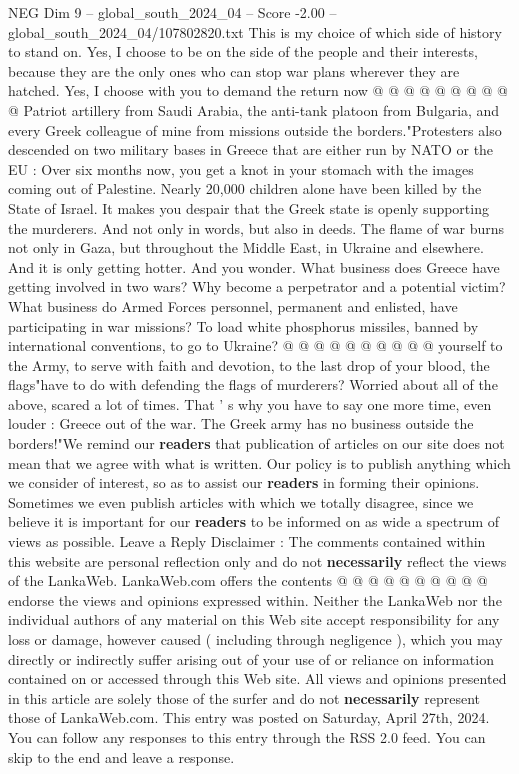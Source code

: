 \begin{textsample}{NEG Dim 9 – global\_south\_2024\_04 – Score -2.00 – global\_south\_2024\_04/107802820.txt}
This is my choice of which side of history to stand on.
Yes, I choose to be on the side of the people and their interests, because they are the only ones who can stop war plans wherever they are hatched.
Yes, I choose with you to demand the return now @ @ @ @ @ @ @ @ @ @ Patriot artillery from Saudi Arabia, the anti-tank platoon from Bulgaria, and every Greek colleague of mine from missions outside the borders."Protesters also descended on two military bases in Greece that are either run by NATO or the EU : Over six months now, you get a knot in your stomach with the images coming out of Palestine.
Nearly 20,000 children alone have been killed by the State of Israel.
It makes you despair that the Greek state is openly supporting the murderers.
And not only in words, but also in deeds.
The flame of war burns not only in Gaza, but throughout the Middle East, in Ukraine and elsewhere.
And it is only getting hotter.
And you wonder.
What business does Greece have getting involved in two wars?
Why become a perpetrator and a potential victim?
What business do Armed Forces personnel, permanent and enlisted, have participating in war missions?
To load white phosphorus missiles, banned by international conventions, to go to Ukraine? @ @ @ @ @ @ @ @ @ @ yourself to the Army, to serve with faith and devotion, to the last drop of your blood, the flags"have to do with defending the flags of murderers?
Worried about all of the above, scared a lot of times.
That ' s why you have to say one more time, even louder : Greece out of the war.
The Greek army has no business outside the borders!"We remind our \textbf{readers} that publication of articles on our site does not mean that we agree with what is written.
Our policy is to publish anything which we consider of interest, so as to assist our \textbf{readers} in forming their opinions.
Sometimes we even publish articles with which we totally disagree, since we believe it is important for our \textbf{readers} to be informed on as wide a spectrum of views as possible.
Leave a Reply Disclaimer : The comments contained within this website are personal reflection only and do not \textbf{necessarily} reflect the views of the LankaWeb.
LankaWeb.com offers the contents @ @ @ @ @ @ @ @ @ @ endorse the views and opinions expressed within.
Neither the LankaWeb nor the individual authors of any material on this Web site accept responsibility for any loss or damage, however caused ( including through negligence ), which you may directly or indirectly suffer arising out of your use of or reliance on information contained on or accessed through this Web site.
All views and opinions presented in this article are solely those of the surfer and do not \textbf{necessarily} represent those of LankaWeb.com.
This entry was posted on Saturday, April 27th, 2024.
You can follow any responses to this entry through the RSS 2.0 feed.
You can skip to the end and leave a response.

\end{textsample}
